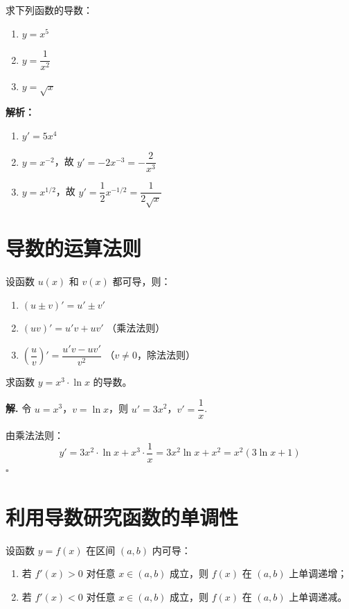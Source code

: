 \begin{exercise}
求下列函数的导数：
\begin{enumerate}
    \item $y = x^5$
    \item $y = \dfrac{1}{x^2}$
    \item $y = \sqrt{x}$
\end{enumerate}
\end{exercise}

\textbf{解析：}
\begin{enumerate}
    \item $y' = 5x^4$
    \item $y = x^{-2}$，故 $y' = -2x^{-3} = -\dfrac{2}{x^3}$
    \item $y = x^{1/2}$，故 $y' = \dfrac{1}{2}x^{-1/2} = \dfrac{1}{2\sqrt{x}}$
\end{enumerate}

\section{导数的运算法则}

\begin{theorem}[导数的四则运算法则]
设函数 $u(x)$ 和 $v(x)$ 都可导，则：
\begin{enumerate}
    \item $(u \pm v)' = u' \pm v'$
    \item $(uv)' = u'v + uv'$ \quad （乘法法则）
    \item $\left(\dfrac{u}{v}\right)' = \dfrac{u'v - uv'}{v^2}$ \quad （$v \neq 0$，除法法则）
\end{enumerate}
\end{theorem}

\begin{example}
求函数 $y = x^3 \cdot \ln x$ 的导数。
\end{example}

\textbf{解.} 令 $u = x^3$，$v = \ln x$，则 $u' = 3x^2$，$v' = \dfrac{1}{x}$.

由乘法法则：
\[ y' = 3x^2 \cdot \ln x + x^3 \cdot \frac{1}{x} = 3x^2\ln x + x^2 = x^2(3\ln x + 1) \]
\hfill $\square$

\section{利用导数研究函数的单调性}

\begin{theorem}[单调性判定]
设函数 $y = f(x)$ 在区间 $(a, b)$ 内可导：
\begin{enumerate}
    \item 若 $f'(x) > 0$ 对任意 $x \in (a, b)$ 成立，则 $f(x)$ 在 $(a, b)$ 上单调递增；
    \item 若 $f'(x) < 0$ 对任意 $x \in (a, b)$ 成立，则 $f(x)$ 在 $(a, b)$ 上单调递减。
\end{enumerate}
\end{theorem}

